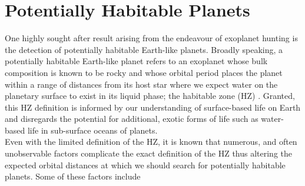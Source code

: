 \iffalse
\section{Potentially Habitable Planets} \label{sect:HZ}
One highly sought after result arising from the endeavour of exoplanet hunting 
is the detection of potentially habitable Earth-like planets. 
Broadly speaking, a potentially habitable Earth-like planet refers to 
an exoplanet whose bulk composition is known to be rocky and whose 
orbital period places the planet within a range of distances from its host star 
where we expect water on the planetary surface to exist in its liquid phase; 
the habitable zone (HZ) \citep{dole64, hart79}. Granted, this HZ 
definition is 
informed by our understanding of surface-based life on Earth and disregards 
the potential for additional, exotic forms of life such as water-based life 
in sub-surface oceans of planets. \\

Even with the limited definition of the 
HZ, it is known that numerous, and often unobservable factors complicate the 
exact definition of the HZ thus altering the expected orbital 
distances at which we should search for potentially habitable planets. 
Some of these factors include 

